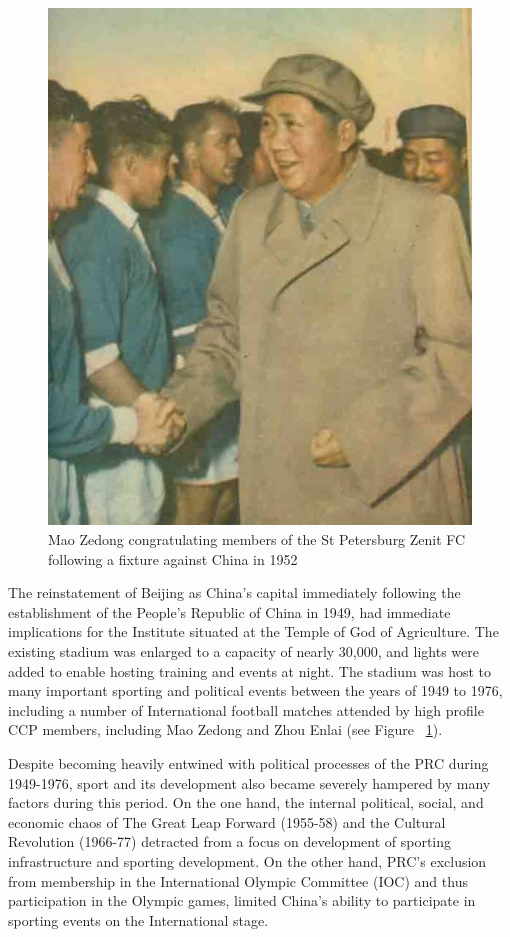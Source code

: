 \begin{CJK}{UTF8}{gbsn}
\begin{figure}[htbp]
  \includegraphics[scale=.5]{images/maoXNT.jpg}
  \caption{Mao Zedong congratulating members of the St Petersburg Zenit FC following a fixture against China in 1952}
  \label{fig:maoXNT}
\end{figure}

The reinstatement of Beijing as China's capital immediately following the establishment of the People's Republic of China in 1949, had immediate implications for the Institute situated at the Temple of God of Agriculture.  The existing stadium was enlarged to a capacity of nearly 30,000, and lights were added to enable hosting training and events at night.  The stadium was host to many important sporting and political events between the years of 1949 to 1976, including a number of International football matches attended by high profile CCP members, including Mao Zedong and Zhou Enlai (see Figure ~\ref{fig:maoXNT}).

Despite becoming heavily entwined with political processes of the PRC during 1949-1976, sport and its development also became severely hampered by many factors during this period.  On the one hand, the internal political, social, and economic chaos of The Great Leap Forward (1955-58) and the Cultural Revolution (1966-77) detracted from a focus on development of sporting infrastructure and sporting development.  On the other hand, PRC's exclusion from membership in the International Olympic Committee (IOC) and thus participation in the Olympic games, limited China's ability to participate in sporting events on the International stage.







\end{CJK}
